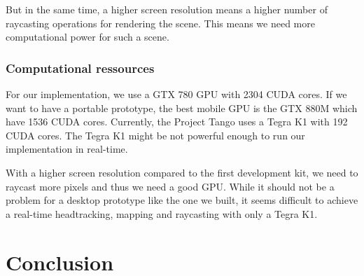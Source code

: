 \documentclass[12pt]{article}
\begin{document}
But in the same time, a higher screen resolution means a higher number of raycasting operations for rendering the scene. This means we need more computational power for such a scene.

\subsubsection{Computational ressources}
For our implementation, we use a GTX 780 GPU with 2304 CUDA cores. If we want to have a portable prototype, the best mobile GPU is the GTX 880M which have 1536 CUDA cores. Currently, the Project Tango uses a Tegra K1 with 192 CUDA cores. The Tegra K1 might be not powerful enough to run our implementation in real-time.

With a higher screen resolution compared to the first development kit, we need to raycast more pixels and thus we need a good GPU. While it should not be a problem for a desktop prototype like the one we built, it seems difficult to achieve a real-time headtracking, mapping and raycasting with only a Tegra K1.

\newpage
\section*{Conclusion}

\newpage
{}


\end{document}
